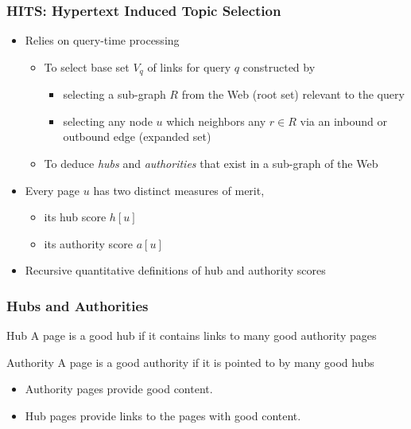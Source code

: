 \documentclass{beamer}
\begin{document}
\begin{frame}
  \frametitle{HITS: Hypertext Induced Topic Selection}

  \begin{itemize}
  \item Relies on query-time processing
    \begin{itemize}
    \item To select base set $V_q$ of links for query $q$ constructed by
      \begin{itemize}
      \item selecting a sub-graph $R$ from the Web (root set) relevant to the
        query
      \item selecting any node $u$ which neighbors any $r \in R$ via an inbound
        or outbound edge (expanded set)
      \end{itemize}
    \item To deduce \emph{hubs} and \emph{authorities} that exist in a
      sub-graph of the Web
    \end{itemize}
  \item Every page $u$ has two distinct measures of merit,
    \begin{itemize}
    \item its hub score $h[u]$
    \item its authority score $a[u]$
    \end{itemize}
  \item Recursive quantitative definitions of hub and authority scores
  \end{itemize}

\end{frame}


\begin{frame}
  \frametitle{Hubs and Authorities}

  \begin{block}{Hub}
    A page is a good hub if it contains links to many good authority pages
  \end{block}

  \begin{block}{Authority}
    A page is a good authority if it is pointed to by many good hubs
  \end{block}

  \begin{itemize}
  \item Authority pages provide good content.
  \item Hub pages provide links to the pages with good content.
  \end{itemize}

\end{frame}
\end{document}
